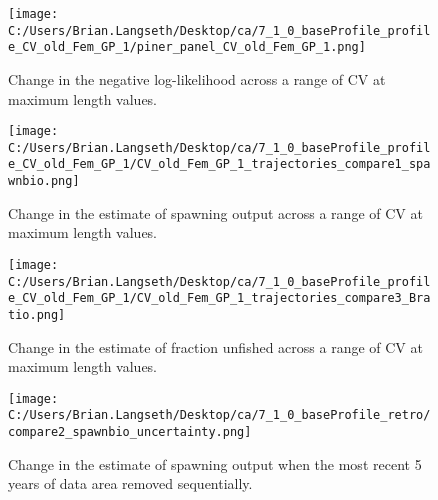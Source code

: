 \documentclass[11pt,
  english,
  a4paper,
]{article}
\begin{document}
\tagmcend\tagstructend


\begin{figure}
\centering
\texttt{[image: C:/Users/Brian.Langseth/Desktop/ca/7\_1\_0\_baseProfile\_profile\_CV\_old\_Fem\_GP\_1/piner\_panel\_CV\_old\_Fem\_GP\_1.png]}
\caption{Change in the negative log-likelihood across a range of CV at maximum length values.\label{fig:cv2-profile}}
\end{figure}

\tagmcend\tagstructend


\begin{figure}
\centering
\texttt{[image: C:/Users/Brian.Langseth/Desktop/ca/7\_1\_0\_baseProfile\_profile\_CV\_old\_Fem\_GP\_1/CV\_old\_Fem\_GP\_1\_trajectories\_compare1\_spawnbio.png]}
\caption{Change in the estimate of spawning output across a range of CV at maximum length values.\label{fig:cv2-ssb}}
\end{figure}

\tagmcend\tagstructend


\begin{figure}
\centering
\texttt{[image: C:/Users/Brian.Langseth/Desktop/ca/7\_1\_0\_baseProfile\_profile\_CV\_old\_Fem\_GP\_1/CV\_old\_Fem\_GP\_1\_trajectories\_compare3\_Bratio.png]}
\caption{Change in the estimate of fraction unfished across a range of CV at maximum length values.\label{fig:cv2-depl}}
\end{figure}

\tagmcend\tagstructend


\begin{figure}
\centering
\texttt{[image: C:/Users/Brian.Langseth/Desktop/ca/7\_1\_0\_baseProfile\_retro/compare2\_spawnbio\_uncertainty.png]}
\caption{Change in the estimate of spawning output when the most recent 5 years of data area removed sequentially.\label{fig:retro-ssb}}
\end{figure}
\end{document}
